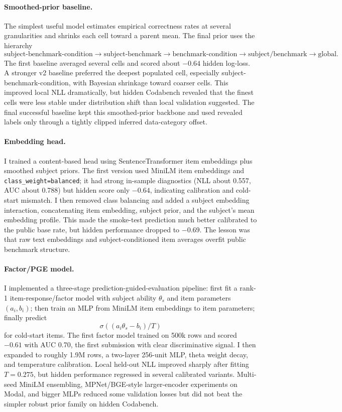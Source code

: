 \documentclass{article}
\begin{document}
\paragraph{Smoothed-prior baseline.}
The simplest useful model estimates empirical correctness rates at several granularities and shrinks each cell toward a parent mean. The final prior uses the hierarchy
\[
\text{subject-benchmark-condition}
\rightarrow
\text{subject-benchmark}
\rightarrow
\text{benchmark-condition}
\rightarrow
\text{subject/benchmark}
\rightarrow
\text{global}.
\]
The first baseline averaged several cells and scored about $-0.64$ hidden log-loss. A stronger v2 baseline preferred the deepest populated cell, especially subject-benchmark-condition, with Bayesian shrinkage toward coarser cells. This improved local NLL dramatically, but hidden Codabench revealed that the finest cells were less stable under distribution shift than local validation suggested. The final successful baseline kept this smoothed-prior backbone and used revealed labels only through a tightly clipped inferred data-category offset.

\paragraph{Embedding head.}
I trained a content-based head using SentenceTransformer item embeddings plus smoothed subject priors. The first version used MiniLM item embeddings and \texttt{class\_weight=balanced}; it had strong in-sample diagnostics (NLL about 0.557, AUC about 0.788) but hidden score only $-0.64$, indicating calibration and cold-start mismatch. I then removed class balancing and added a subject embedding interaction, concatenating item embedding, subject prior, and the subject's mean embedding profile. This made the smoke-test prediction much better calibrated to the public base rate, but hidden performance dropped to $-0.69$. The lesson was that raw text embeddings and subject-conditioned item averages overfit public benchmark structure.

\paragraph{Factor/PGE model.}
I implemented a three-stage prediction-guided-evaluation pipeline: first fit a rank-1 item-response/factor model with subject ability $\theta_s$ and item parameters $(a_i,b_i)$; then train an MLP from MiniLM item embeddings to item parameters; finally predict
\[
  \sigma((a_i\theta_s-b_i)/T)
\]
for cold-start items. The first factor model trained on 500k rows and scored $-0.61$ with AUC 0.70, the first submission with clear discriminative signal. I then expanded to roughly 1.9M rows, a two-layer 256-unit MLP, theta weight decay, and temperature calibration. Local held-out NLL improved sharply after fitting $T=0.275$, but hidden performance regressed in several calibrated variants. Multi-seed MiniLM ensembling, MPNet/BGE-style larger-encoder experiments on Modal, and bigger MLPs reduced some validation losses but did not beat the simpler robust prior family on hidden Codabench.
\end{document}
